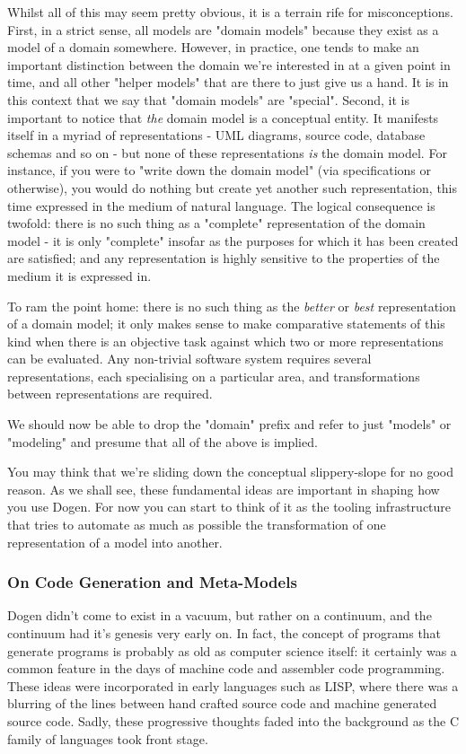 \documentclass[11pt]{article}
\begin{document}
Whilst all of this may seem pretty obvious, it is a terrain rife for
misconceptions. First, in a strict sense, all models are "domain
models" because they exist as a model of a domain somewhere. However,
in practice, one tends to make an important distinction between the
domain we're interested in at a given point in time, and all other
"helper models" that are there to just give us a hand. It is in this
context that we say that "domain models" are "special". Second, it is
important to notice that \emph{the} domain model is a conceptual entity. It
manifests itself in a myriad of representations - UML diagrams, source
code, database schemas and so on - but none of these representations
\emph{is} the domain model. For instance, if you were to "write down the
domain model" (via specifications or otherwise), you would do nothing
but create yet another such representation, this time expressed in the
medium of natural language. The logical consequence is twofold: there
is no such thing as a "complete" representation of the domain model -
it is only "complete" insofar as the purposes for which it has been
created are satisfied; and any representation is highly sensitive to
the properties of the medium it is expressed in.

To ram the point home: there is no such thing as the \emph{better} or
\emph{best} representation of a domain model; it only makes sense to make
comparative statements of this kind when there is an objective task
against which two or more representations can be evaluated. Any
non-trivial software system requires several representations, each
specialising on a particular area, and transformations between
representations are required.

We should now be able to drop the "domain" prefix and refer to just
"models" or "modeling" and presume that all of the above is implied.

You may think that we're sliding down the conceptual slippery-slope
for no good reason. As we shall see, these fundamental ideas are
important in shaping how you use Dogen. For now you can start to think
of it as the tooling infrastructure that tries to automate as much as
possible the transformation of one representation of a model into
another.

\subsubsection{On Code Generation and Meta-Models}
\label{sec-2-1-3}

Dogen didn't come to exist in a vacuum, but rather on a continuum, and
the continuum had it's genesis very early on. In fact, the concept of
programs that generate programs is probably as old as computer science
itself: it certainly was a common feature in the days of machine code
and assembler code programming. These ideas were incorporated in early
languages such as LISP, where there was a blurring of the lines
between hand crafted source code and machine generated source
code. Sadly, these progressive thoughts faded into the background as
the C family of languages took front stage.
\end{document}
